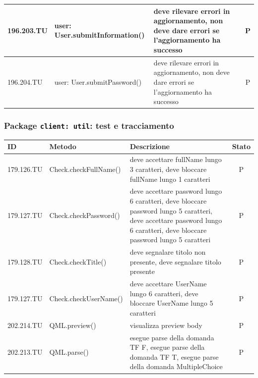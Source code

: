 \documentclass[12pt,a4paper]{article}
\begin{document}
\begin{center}
\begin{longtable}[H]{l p{} p{} c}
		196.203.TU& user: \newline  User.submitInformation() & deve rilevare errori in aggiornamento, non deve dare errori se l'aggiornamento ha successo  & P\\ \midrule
		196.204.TU& user: \newline  User.submitPassword() & deve rilevare errori in aggiornamento, non deve dare errori se l'aggiornamento ha successo  & P\\ \midrule
		
	\end{longtable}
\end{center}

\subsubsection{Package \texttt{client: util}: test e tracciamento}
\begin{center}
	\begin{longtable}[]{l l p{} c}\midrule
	\textbf{ID} & \textbf{Metodo} & \textbf{Descrizione} & \textbf{Stato}\\ \midrule
	\midrule		
	179.126.TU&  Check.checkFullName() & deve accettare fullName lungo 3 caratteri, deve bloccare fullName lungo 1 caratteri & P\\ \midrule
	179.127.TU&  Check.checkPassword() & deve accettare password lungo 6 caratteri, deve bloccare password lungo 5 caratteri, deve accettare password lungo 6 caratteri, deve bloccare password lungo 5 caratteri & P \\ \midrule
	179.128.TU&  Check.checkTitle() & deve segnalare titolo non presente, deve segnalare titolo presente & P \\ \midrule
	179.127.TU&  Check.checkUserName() & deve accettare UserName lungo 6 caratteri, deve bloccare UserName lungo 5 caratteri  & P\\ \midrule
	202.214.TU&  QML.preview() & visualizza preview body  & P\\ \midrule
	202.213.TU&  QML.parse() & esegue parse della domanda TF F, esegue parse della domanda TF T, esegue parse della domanda MultipleChoice  & P\\ \midrule

\end{longtable}
\end{center}
\end{document}
